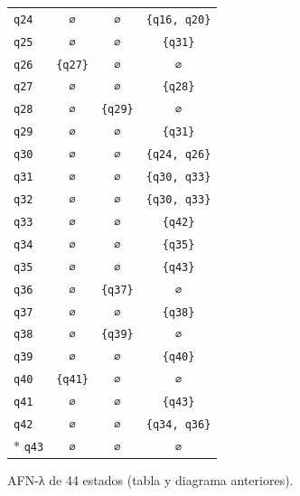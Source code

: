 \documentclass[11pt]{article}
\begin{document}
\begin{center}
\begin{tabular}{lccc}
 \texttt{q24} & \texttt{∅} & \texttt{∅} & \texttt{\{q16, q20\}} \\
 \texttt{q25} & \texttt{∅} & \texttt{∅} & \texttt{\{q31\}} \\
 \texttt{q26} & \texttt{\{q27\}} & \texttt{∅} & \texttt{∅} \\
 \texttt{q27} & \texttt{∅} & \texttt{∅} & \texttt{\{q28\}} \\
 \texttt{q28} & \texttt{∅} & \texttt{\{q29\}} & \texttt{∅} \\
 \texttt{q29} & \texttt{∅} & \texttt{∅} & \texttt{\{q31\}} \\
 \texttt{q30} & \texttt{∅} & \texttt{∅} & \texttt{\{q24, q26\}} \\
 \texttt{q31} & \texttt{∅} & \texttt{∅} & \texttt{\{q30, q33\}} \\
 \texttt{q32} & \texttt{∅} & \texttt{∅} & \texttt{\{q30, q33\}} \\
 \texttt{q33} & \texttt{∅} & \texttt{∅} & \texttt{\{q42\}} \\
 \texttt{q34} & \texttt{∅} & \texttt{∅} & \texttt{\{q35\}} \\
 \texttt{q35} & \texttt{∅} & \texttt{∅} & \texttt{\{q43\}} \\
 \texttt{q36} & \texttt{∅} & \texttt{\{q37\}} & \texttt{∅} \\
 \texttt{q37} & \texttt{∅} & \texttt{∅} & \texttt{\{q38\}} \\
 \texttt{q38} & \texttt{∅} & \texttt{\{q39\}} & \texttt{∅} \\
 \texttt{q39} & \texttt{∅} & \texttt{∅} & \texttt{\{q40\}} \\
 \texttt{q40} & \texttt{\{q41\}} & \texttt{∅} & \texttt{∅} \\
 \texttt{q41} & \texttt{∅} & \texttt{∅} & \texttt{\{q43\}} \\
 \texttt{q42} & \texttt{∅} & \texttt{∅} & \texttt{\{q34, q36\}} \\
$*$ \texttt{q43} & \texttt{∅} & \texttt{∅} & \texttt{∅} \\
\bottomrule\end{tabular}\end{center}

\resp AFN-λ de 44 estados (tabla y diagrama anteriores).
\end{document}
